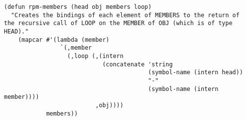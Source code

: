 \documentclass[a4paper,11pt]{article}
\begin{document}
{\begin{verbatim}
(defun rpm-members (head obj members loop)
  "Creates the bindings of each element of MEMBERS to the return of
the recursive call of LOOP on the MEMBER of OBJ (which is of type HEAD)."
    (mapcar #'(lambda (member)
                `(,member
                  (,loop (,(intern 
                            (concatenate 'string
                                         (symbol-name (intern head))
                                         "-"
                                         (symbol-name (intern member))))
                          ,obj))))
            members))
\end{verbatim}%
}
\end{document}
